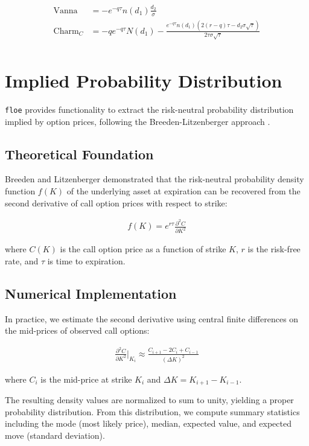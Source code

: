 \documentclass[11pt, a4paper]{article}
\begin{document}
\begin{align}
\text{Vanna} &= -e^{-q\tau} n(d_1) \frac{d_2}{\sigma} \\
\text{Charm}_C &= -q e^{-q\tau} N(d_1) - \frac{e^{-q\tau} n(d_1) \left(2(r-q)\tau - d_2 \sigma \sqrt{\tau}\right)}{2\tau \sigma \sqrt{\tau}} \\
\end{align}

\section{Implied Probability Distribution}

\texttt{floe} provides functionality to extract the risk-neutral probability distribution implied by option prices, following the Breeden-Litzenberger approach \cite{breeden1978prices}.

\subsection{Theoretical Foundation}

Breeden and Litzenberger demonstrated that the risk-neutral probability density function $f(K)$ of the underlying asset at expiration can be recovered from the second derivative of call option prices with respect to strike:

\begin{align}
f(K) = e^{r\tau} \frac{\partial^2 C}{\partial K^2}
\end{align}

where $C(K)$ is the call option price as a function of strike $K$, $r$ is the risk-free rate, and $\tau$ is time to expiration.

\subsection{Numerical Implementation}

In practice, we estimate the second derivative using central finite differences on the mid-prices of observed call options:

\begin{align}
\frac{\partial^2 C}{\partial K^2} \bigg|_{K_i} \approx \frac{C_{i+1} - 2C_i + C_{i-1}}{(\Delta K)^2}
\end{align}

where $C_i$ is the mid-price at strike $K_i$ and $\Delta K = K_{i+1} - K_{i-1}$.

The resulting density values are normalized to sum to unity, yielding a proper probability distribution. From this distribution, we compute summary statistics including the mode (most likely price), median, expected value, and expected move (standard deviation).
\end{document}
